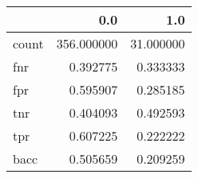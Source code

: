 \begin{tabular}{lrr}
\toprule
{} &         0.0 &        1.0 \\
\midrule
count &  356.000000 &  31.000000 \\
fnr   &    0.392775 &   0.333333 \\
fpr   &    0.595907 &   0.285185 \\
tnr   &    0.404093 &   0.492593 \\
tpr   &    0.607225 &   0.222222 \\
bacc  &    0.505659 &   0.209259 \\
\bottomrule
\end{tabular}
